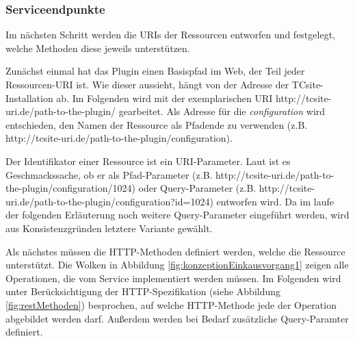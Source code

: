 \documentclass[11pt, a4paper, titlepage, listof=totoc, bibliography=totoc, index=totoc, twoside, openright, headings=normal, draft]{scrreprt}
\begin{document}
\subsubsection{Serviceendpunkte}
Im nächsten Schritt werden die URIs der Ressourcen entworfen und festgelegt, welche Methoden diese jeweils unterstützen.

Zunächst einmal hat das Plugin einen Basispfad im Web, der Teil jeder Ressourcen-URI ist. Wie dieser aussieht, hängt von der Adresse der TCsite-Installation ab. Im Folgenden wird mit der exemplarischen URI \glqq http://tcsite-uri.de/path-to-the-plugin/\grqq{} gearbeitet. Als Adresse für die \emph{configuration} wird entschieden, den Namen der Ressource als Pfadende zu verwenden (z.B. \glqq http://tcsite-uri.de/path-to-the-plugin/configuration\grqq{}).

Der Identifikator einer Ressource ist ein URI-Parameter. Laut \citet{tilkov11} ist es Geschmackssache, ob er als Pfad-Parameter (z.B. \glqq http://tcsite-uri.de/path-to-the-plugin/configuration/1024\grqq{}) oder Query-Parameter (z.B. \glqq http://tcsite-uri.de/path-to-the-plugin/configuration?id=1024\grqq{}) entworfen wird. Da im laufe der folgenden Erläuterung noch weitere Query-Parameter eingeführt werden, wird aus Konsistenzgründen letztere Variante gewählt.

Als nächstes müssen die HTTP-Methoden definiert werden, welche die Ressource unterstützt. Die Wolken in Abbildung \ref{fig:konzeptionEinkausvorgang1} zeigen alle Operationen, die vom Service implementiert werden müssen. Im Folgenden wird unter Berücksichtigung der HTTP-Spezifikation (siehe Abbildung \ref{fig:restMethoden}) besprochen, auf welche HTTP-Methode jede der Operation abgebildet werden darf. Außerdem werden bei Bedarf zusätzliche Query-Paramter definiert.
\end{document}
